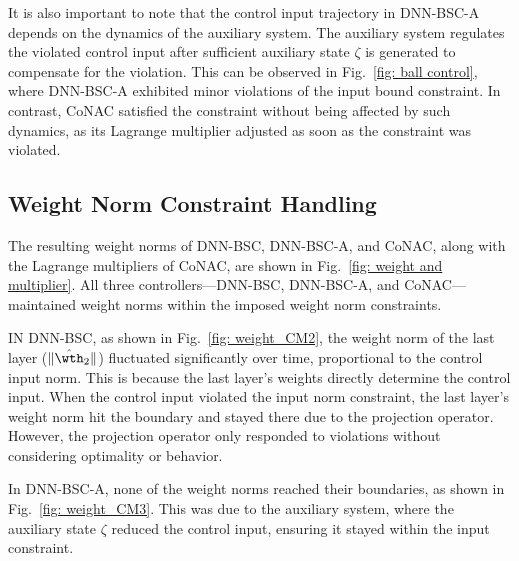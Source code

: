 \documentclass[lettersize,journal]{IEEEtran}
\begin{document}
It is also important to note that the control input trajectory in DNN-BSC-A depends on the dynamics of the auxiliary system. The auxiliary system regulates the violated control input after sufficient auxiliary state $\zeta$ is generated to compensate for the violation. This can be observed in Fig.~\ref{fig: ball control}, where DNN-BSC-A exhibited minor violations of the input bound constraint. In contrast, CoNAC satisfied the constraint without being affected by such dynamics, as its Lagrange multiplier adjusted as soon as the constraint was violated.


\subsection{Weight Norm Constraint Handling}

The resulting weight norms of DNN-BSC, DNN-BSC-A, and CoNAC, along with the Lagrange multipliers of CoNAC, are shown in Fig.~\ref{fig: weight and multiplier}. All three controllers—DNN-BSC, DNN-BSC-A, and CoNAC—maintained weight norms within the imposed weight norm constraints.

IN DNN-BSC, as shown in Fig.~\ref{fig: weight_CM2}, the weight norm of the last layer (\ie $\Vert {{{\hat \wth }_2}} \Vert$) fluctuated significantly over time, proportional to the control input norm. This is because the last layer’s weights directly determine the control input. When the control input violated the input norm constraint, the last layer’s weight norm hit the boundary and stayed there due to the projection operator. However, the projection operator only responded to violations without considering optimality or behavior.

In DNN-BSC-A, none of the weight norms reached their boundaries, as shown in Fig.~\ref{fig: weight_CM3}. This was due to the auxiliary system, where the auxiliary state $\zeta$ reduced the control input, ensuring it stayed within the input constraint.
\end{document}
